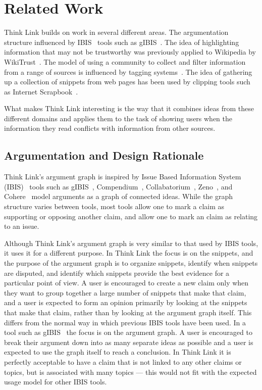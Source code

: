 \documentclass{chi2009}
\newcommand{\todo}[1]{}
\begin{document}
\section{Related Work}
\todo{Don't cite things that aren't relevant}

Think Link builds on work in several different areas. The argumentation structure influenced by IBIS~\cite{Rittel1973} tools such as gIBIS~\cite{Conklin1987a}. The idea of highlighting information that may not be trustworthy was previously applied to Wikipedia by WikiTrust~\cite{Adler2008a}. The model of using a community to collect and filter information from a range of sources is influenced by tagging systems~\cite{Marlow2006}. The idea of gathering up a collection of snippets from web pages has been used by clipping tools such as Internet Scrapbook~\cite{Sugiura1998}. 

What makes Think Link interesting is the way that it combines ideas from these different domains and applies them to the task of showing users when the information they read conflicts with information from other sources.

\subsection{Argumentation and Design Rationale}

Think Link's argument graph is inspired by Issue Based Information System (IBIS)~\cite{Rittel1973} tools such as gIBIS~\cite{Conklin1987a}, Compendium~\cite{Selvin2001}, Collabatorium~\cite{Klein2007}, Zeno~\cite{Gordon1997}, and Cohere~\cite{Shum2008} model arguments as a graph of connected ideas. While the graph structure varies between tools, most tools allow one to mark a claim as supporting or opposing another claim, and allow one to mark an claim as relating to an issue. 

Although Think Link's argument graph is very similar to that used by IBIS tools, it uses it for a different purpose. In Think Link the focus is on the snippets, and the purpose of the argument graph is to organize snippets, identify when snippets are disputed, and identify which snippets provide the best evidence for a particular point of view. A user is encouraged to create a new claim only when they want to group together a large number of snippets that make that claim, and a user is expected to form an opinion primarily by looking at the snippets that make that claim, rather than by looking at the argument graph itself. This differs from the normal way in which previous IBIS tools have been used. In a tool such as gIBIS~\cite{Conklin1987a} the focus is on the argument graph. A user is encouraged to break their argument down into as many separate ideas as possible and a user is expected to use the graph itself to reach a conclusion. In Think Link it is perfectly acceptable to have a claim that is not linked to any other claims or topics, but is associated with many topics --- this would not fit with the expected usage model for other IBIS tools.
\end{document}
